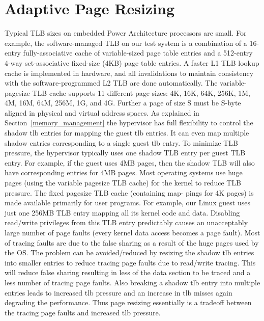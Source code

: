 \section{Adaptive Page Resizing}
Typical TLB sizes on embedded Power Architecture processors are small. For example, the software-managed TLB on our test system is a combination of a 16-entry fully-associative cache of variable-sized page table entries and a 512-entry 4-way set-associative fixed-size (4KB) page table entries. A faster L1 TLB lookup cache is implemented in hardware, and all invalidations to maintain consistency with the software-programmed L2 TLB are done automatically. The variable-pagesize TLB cache supports 11 different page sizes: 4K, 16K, 64K, 256K, 1M, 4M, 16M, 64M, 256M, 1G, and 4G. Further a page of size S must be S-byte aligned in physical and virtual address spaces.
As explained in Section~\ref{memory_management} the hypervisor has full flexibility to control the shadow tlb entries for mapping the guest tlb entries. It can even map multiple shadow entries corresponding to a single guest tlb entry. To minimize TLB pressure, the hypervisor typically uses one shadow TLB entry per guest TLB entry. For example, if the guest uses 4MB pages, then the shadow TLB will also have corresponding entries for 4MB pages. Most operating systems use huge pages (using the variable pagesize TLB cache) for the kernel to reduce TLB pressure. The fixed pagesize TLB cache (containing map- pings for 4K pages) is made available primarily for user programs. For example, our Linux guest uses just one 256MB TLB entry mapping all its kernel code and data. Disabling read/write privileges from this TLB entry predictably causes an unacceptably large number of page faults (every kernel data access becomes a page fault).
Most of tracing faults are due to the false sharing as a result of the huge pages used by the OS. The problem can be avoided/reduced by resizing the shadow tlb entries into smaller entries to reduce tracing page faults due to read/write tracing. This will reduce false sharing resulting in less of the data section to be traced and a less number of tracing page faults. Also breaking a shadow tlb entry into multiple entries leads to increased tlb pressure and an increase in tlb misses again degrading the performance. Thus page resizing essentially is a tradeoff between the tracing page faults and increased tlb pressure.
